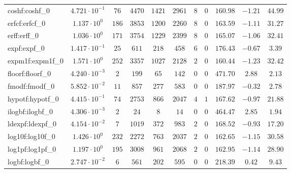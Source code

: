 \begin{tabular}{|l|c|c|c|c|c|c|c|c|c|c|}
coshf:coshf\_0               & $ 4.721 \cdot 10^{-1} $ & $ 76     $ & $ 4470  $ & $ 1421  $ & $ 2961  $ & $ 8   $ & $ 0 $ & $ 160.98      $ & $ -1.21   $ & $ 44.99   $ \\
erfcf:erfcf\_0               & $ 1.137 \cdot 10^{0}  $ & $ 186    $ & $ 3853  $ & $ 1200  $ & $ 2260  $ & $ 8   $ & $ 0 $ & $ 163.59      $ & $ -1.11   $ & $ 31.27   $ \\
erff:erff\_0                 & $ 1.036 \cdot 10^{0}  $ & $ 171    $ & $ 3754  $ & $ 1229  $ & $ 2399  $ & $ 8   $ & $ 0 $ & $ 165.07      $ & $ -1.06   $ & $ 32.41   $ \\
expf:expf\_0                 & $ 1.417 \cdot 10^{-1} $ & $ 25     $ & $ 611   $ & $ 218   $ & $ 458   $ & $ 6   $ & $ 0 $ & $ 176.43      $ & $ -0.67   $ & $ 3.39    $ \\
expm1f:expm1f\_0             & $ 1.571 \cdot 10^{0}  $ & $ 252    $ & $ 3357  $ & $ 1027  $ & $ 2128  $ & $ 2   $ & $ 0 $ & $ 160.44      $ & $ -1.23   $ & $ 32.42   $ \\
floorf:floorf\_0             & $ 4.240 \cdot 10^{-3} $ & $ 2      $ & $ 199   $ & $ 65    $ & $ 142   $ & $ 0   $ & $ 0 $ & $ 471.70      $ & $ 2.88    $ & $ 2.13    $ \\
fmodf:fmodf\_0               & $ 5.852 \cdot 10^{-2} $ & $ 11     $ & $ 857   $ & $ 277   $ & $ 583   $ & $ 0   $ & $ 0 $ & $ 187.97      $ & $ -0.32   $ & $ 2.78    $ \\
hypotf:hypotf\_0             & $ 4.415 \cdot 10^{-1} $ & $ 74     $ & $ 2753  $ & $ 866   $ & $ 2047  $ & $ 4   $ & $ 1 $ & $ 167.62      $ & $ -0.97   $ & $ 21.88   $ \\
ilogbf:ilogbf\_0             & $ 4.306 \cdot 10^{-3} $ & $ 2      $ & $ 24    $ & $ 8     $ & $ 14    $ & $ 0   $ & $ 0 $ & $ 464.47      $ & $ 2.85    $ & $ 1.94    $ \\
ldexpf:ldexpf\_0             & $ 4.154 \cdot 10^{-2} $ & $ 7      $ & $ 1019  $ & $ 372   $ & $ 983   $ & $ 2   $ & $ 0 $ & $ 168.52      $ & $ -0.93   $ & $ 17.20   $ \\
log10f:log10f\_0             & $ 1.426 \cdot 10^{0}  $ & $ 232    $ & $ 2272  $ & $ 763   $ & $ 2037  $ & $ 2   $ & $ 0 $ & $ 162.65      $ & $ -1.15   $ & $ 30.58   $ \\
log1pf:log1pf\_0             & $ 1.197 \cdot 10^{0}  $ & $ 195    $ & $ 3008  $ & $ 961   $ & $ 2068  $ & $ 2   $ & $ 0 $ & $ 162.95      $ & $ -1.14   $ & $ 28.90   $ \\
logbf:logbf\_0               & $ 2.747 \cdot 10^{-2} $ & $ 6      $ & $ 561   $ & $ 202   $ & $ 595   $ & $ 0   $ & $ 0 $ & $ 218.39      $ & $ 0.42    $ & $ 9.43    $ \\

\end{tabular}
